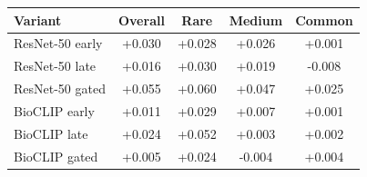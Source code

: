 \begin{tabular}{lcccc}
\toprule
Variant & Overall & Rare & Medium & Common \\
\midrule
ResNet-50 early & +0.030 & +0.028 & +0.026 & +0.001 \\
ResNet-50 late & +0.016 & +0.030 & +0.019 & -0.008 \\
ResNet-50 gated & +0.055 & +0.060 & +0.047 & +0.025 \\
BioCLIP early & +0.011 & +0.029 & +0.007 & +0.001 \\
BioCLIP late & +0.024 & +0.052 & +0.003 & +0.002 \\
BioCLIP gated & +0.005 & +0.024 & -0.004 & +0.004 \\
\bottomrule
\end{tabular}
